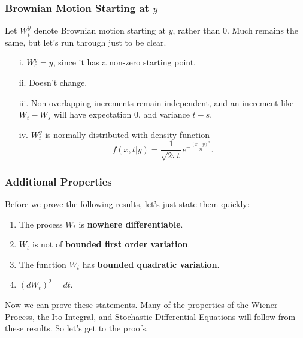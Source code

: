 \documentclass[12pt]{article}
\theoremstyle{plain}
\theoremstyle{definition}
\theoremstyle{remark}
\begin{document}
\subsubsection{Brownian Motion Starting at $y$}

Let $W^y_t$ denote Brownian motion starting at $y$, rather than $0$.
Much remains the same, but let's run through just to be clear.
\begin{enumerate}
   \item[i.]{$W^y_0 = y$, since it has a non-zero starting point.}
   \item[ii.]{Doesn't change.}
   \item[iii.]{Non-overlapping increments remain independent, and an
      increment like $W_t - W_s$ will have
      expectation $0$, and variance $t - s$.}
   \item[iv.]{ $W^y_t$ is normally distributed with density function
      \[ f(x,t|y) = \frac{1}{\sqrt{2\pi t}} e^{-\frac{(x-y)^2}{2t}}.\]
      }
\end{enumerate}

\subsubsection{Additional Properties}

Before we prove the following results, let's just state them quickly:
\begin{enumerate}
   \item{The process $W_t$ is \textbf{nowhere differentiable}.}
   \item{$W_t$ is not of \textbf{bounded first order variation}.}
   \item{The function $W_t$ has \textbf{bounded quadratic
      variation}.}
   \item{$(dW_t)^2 = dt$.}
\end{enumerate}
Now we can prove these statements. Many of the properties of the Wiener
Process, the It\={o} Integral, and Stochastic Differential Equations
will follow from these results. So let's get to the proofs.
\end{document}

